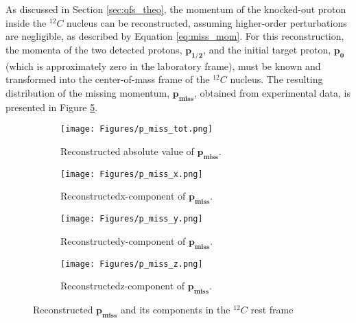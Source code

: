 As discussed in Section \ref{sec:qfs_theo}, the momentum of the knocked-out proton inside the $^{12}C$ nucleus can be reconstructed, assuming higher-order perturbations are negligible, as described by Equation \ref{eq:miss_mom}. For this reconstruction, the momenta of the two detected protons, $\mathbf{p_{1/2}}$, and the initial target proton, $\mathbf{p_{0}}$ (which is approximately zero in the laboratory frame), must be known and transformed into the center-of-mass frame of the $^{12}C$ nucleus. The resulting distribution of the missing momentum, $\mathbf{p_{miss}}$, obtained from experimental data, is presented in Figure \ref{fig:p_miss}.\newline
\begin{figure}[htpb]
    \centering
    \begin{subfigure}[b]{0.9\textwidth}
        \centering
        \texttt{[image: Figures/p\_miss\_tot.png]} %
        \caption{Reconstructed absolute value of $\mathbf{p_{miss}}$.}
        \label{fig:p_miss_tot}
    \end{subfigure}

    \begin{subfigure}[b]{0.3\textwidth}
        \centering
        \texttt{[image: Figures/p\_miss\_x.png]} %
        \caption{Reconstructed\newline x-component of $\mathbf{p_{miss}}$.}
        \label{fig:p_miss_x}
    \end{subfigure}
    \begin{subfigure}[b]{0.3\textwidth}
        \centering
        \texttt{[image: Figures/p\_miss\_y.png]} %
        \caption{Reconstructed\newline y-component of $\mathbf{p_{miss}}$.}
        \label{fig:p_miss_y}
    \end{subfigure}
    \begin{subfigure}[b]{0.3\textwidth}
        \centering
        \texttt{[image: Figures/p\_miss\_z.png]} %
        \caption{Reconstructed\newline z-component of $\mathbf{p_{miss}}$.}
        \label{fig:p_miss_z}
    \end{subfigure}

    \caption{Reconstructed $\mathbf{p_{miss}}$ and its components in the $^{12}C$ rest frame}
    \label{fig:p_miss}
\end{figure}

